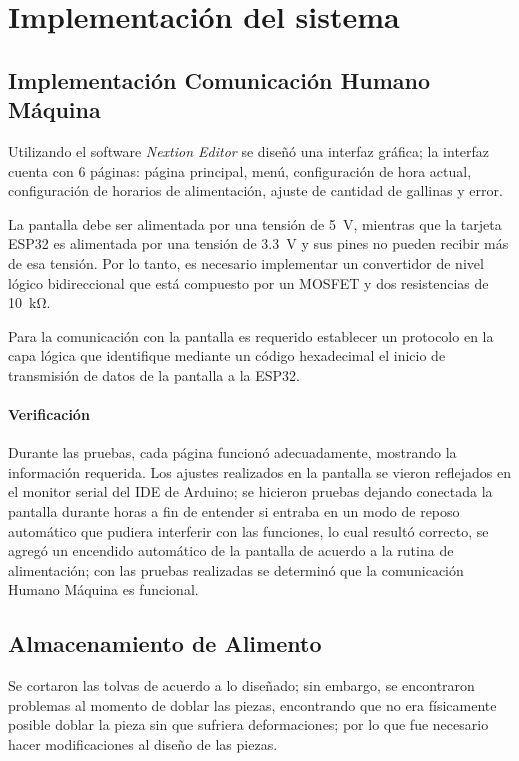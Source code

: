 \chapter{Implementaci\'on del sistema}
%
\section{Implementación Comunicación Humano Máquina}

Utilizando el software \textit{Nextion Editor} se diseñó una interfaz gráfica; la interfaz cuenta con 6 páginas: página principal, menú, configuración de hora actual, configuración de horarios de alimentación, ajuste de cantidad de gallinas y error.

La pantalla debe ser alimentada por una tensión de \SI{5}{\volt}, mientras que la tarjeta ESP32 es alimentada por una tensión de \SI{3.3}{\volt} y sus pines no pueden recibir más de  esa tensión. Por lo tanto, es necesario implementar un convertidor de nivel lógico bidireccional que está compuesto por un MOSFET y dos resistencias de \SI{10}{\kilo\ohm}.

Para la comunicación con la pantalla es requerido establecer un protocolo en la capa lógica que identifique mediante un código hexadecimal el inicio de transmisión de datos de la pantalla a la ESP32.

\subsubsection{Verificación}

Durante las pruebas, cada página funcionó adecuadamente, mostrando la información requerida. Los ajustes realizados en la pantalla se vieron reflejados en el monitor serial del IDE de Arduino; se hicieron pruebas dejando conectada la pantalla durante horas a fin de entender si entraba en un modo de reposo automático que pudiera interferir con las funciones, lo cual resultó correcto, se agregó un encendido automático de la pantalla de acuerdo a la rutina de alimentación; con las pruebas realizadas se determinó que la comunicación Humano Máquina es funcional.

\section{Almacenamiento de Alimento}

Se cortaron las tolvas de acuerdo a lo diseñado; sin embargo, se encontraron problemas al momento de doblar las piezas, encontrando que no era físicamente posible doblar la pieza sin que sufriera deformaciones; por lo que fue necesario hacer modificaciones al diseño de las piezas. 

